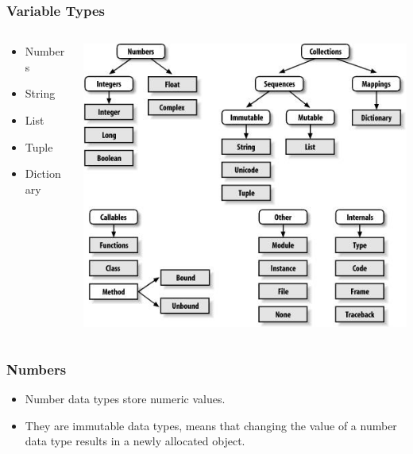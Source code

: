 \documentclass{../py-lecture}
\begin{document}
\begin{frame}
	\frametitle{Variable Types}
  \begin{columns}
    \begin{column}{0.5\textwidth}
      \begin{itemize}
        \item Numbers
        \item String
        \item List
        \item Tuple
        \item Dictionary
      \end{itemize}
    \end{column}
    \begin{column}{0.5\textwidth}
	    \includegraphics[width=\linewidth]{img/python-types.jpg}
    \end{column}
  \end{columns}
\end{frame}

\begin{frame}
	\frametitle{Numbers}
  \begin{itemize}
    \item Number data types store numeric values.
    \item They are immutable data types, means that changing the value of
      a number data type results in a newly allocated object.
  \end{itemize}
\end{frame}
\end{document}
